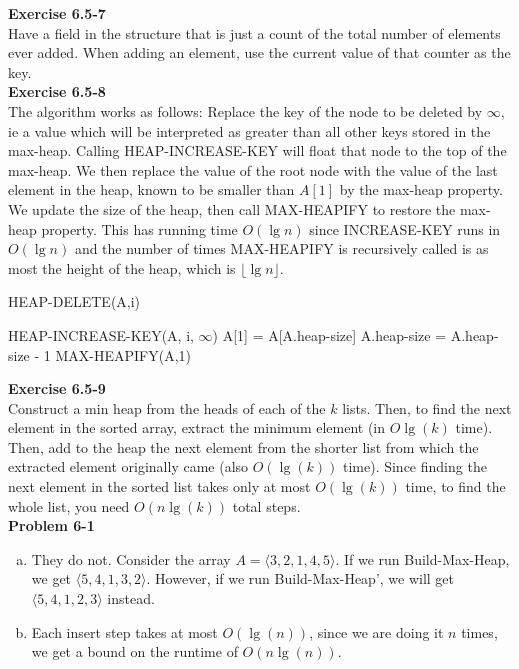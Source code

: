 \documentclass{article}
\begin{document}
\noindent\textbf{Exercise 6.5-7}\\

Have a field in the structure that is just a count of the total number of elements ever added. When adding an element, use the current value of that counter as the key.\\

\noindent\textbf{Exercise 6.5-8}\\

The algorithm works as follows:  Replace the key of the node to be deleted by $\infty$, ie a value which will be interpreted as greater than all other keys stored in the max-heap.  Calling HEAP-INCREASE-KEY will float that node to the top of the max-heap.  We then replace the value of the root node with the value of the last element in the heap, known to be smaller than $A[1]$ by the max-heap property.  We update the size of the heap, then call MAX-HEAPIFY to restore the max-heap property.  This has running time $O(\lg n)$ since INCREASE-KEY runs in $O(\lg n)$ and the number of times MAX-HEAPIFY is recursively called is as most the height of the heap, which is $\lfloor \lg n \rfloor$.

\begin{algorithm}
\caption{HEAP-DELETE(A,i)}
\begin{algorithmic}[1]
\State HEAP-INCREASE-KEY(A, i, $\infty$)
\State A[1] = A[A.heap-size] 
\State A.heap-size = A.heap-size - 1
\State MAX-HEAPIFY(A,1)
\end{algorithmic}
\end{algorithm}

\noindent\textbf{Exercise 6.5-9}\\

Construct a min heap from the heads of each of the $k$ lists. Then, to find the next element in the sorted array, extract the minimum element (in $O\lg(k)$ time). Then, add to the heap the next element from the shorter list from which the extracted element originally came (also $O(\lg(k))$ time). Since finding the next element in the sorted list takes only at most $O(\lg(k))$ time, to find the whole list, you need $O(n\lg(k))$ total steps. \\



\noindent\textbf{Problem 6-1}\\

\begin{enumerate}[a.]
\item
They do not. Consider the array $A =\langle 3,2,1,4,5\rangle$. If we run Build-Max-Heap, we get $\langle 5,4,1,3,2\rangle$. However, if we run Build-Max-Heap', we will get $\langle 5,4,1,2,3\rangle$ instead.
\item
Each insert step takes at most $O(\lg(n))$, since we are doing it $n$ times, we get a bound on the runtime of $O(n\lg(n))$.
\end{enumerate}
\end{document}
